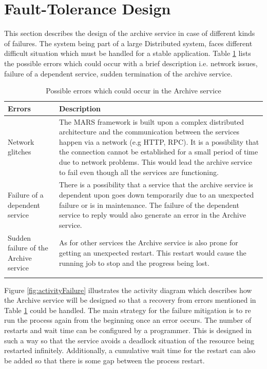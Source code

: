 \newpage
\section{Fault-Tolerance Design}
\label{sec:ftDesign}
This section describes the design of the archive service in case of different kinds of failures. The system being part of a large Distributed system,
faces different difficult situation which must be handled for a stable application. Table \ref{table:probServices} lists the possible errors which 
could occur with a brief description i.e. network issues, failure of a 
dependent service, sudden termination of the archive service. 
\begin{longtable}{|p{4cm}|p{10cm}|}
    \hline
        \textbf{Errors}  & \textbf{Description}\\
    \hline
        Network glitches & The MARS framework is built upon a complex distributed architecture and the communication between the services
        happen via a network (e.g HTTP, RPC). It is a possibility that the connection cannot be established for a small period of time due to network problems.
        This would lead the archive service to fail even though all the services are functioning.\\
    \hline
        Failure of a dependent service & There is a possibility that a service that the archive service is dependent upon goes down temporarily due to an unexpected
        failure or is in maintenance. The failure of the dependent service to reply would also generate an error in the Archive service.\\
    \hline
        Sudden failure of the Archive service & As for other services the Archive service is also prone for getting an unexpected restart. This restart would cause
        the running job to stop and the progress being lost.\\    
    \hline
    \caption{Possible errors which could occur in the Archive service}
    \label{table:probServices} 
\end{longtable}

Figure \ref{fig:activityFailure} illustrates the activity diagram which describes how the Archive service will be designed so that a recovery from errors mentioned in
Table \ref{table:probServices} could be handled. The main strategy for the failure mitigation is to re run the process again from the beginning once an error occurs. 
The number of restarts and wait time can be configured by a programmer. This is designed in such a way so that the service avoids a deadlock situation of the
resource being restarted infinitely. Additionally, a cumulative wait time for the restart can also be added so that there is some gap between the process restart.

